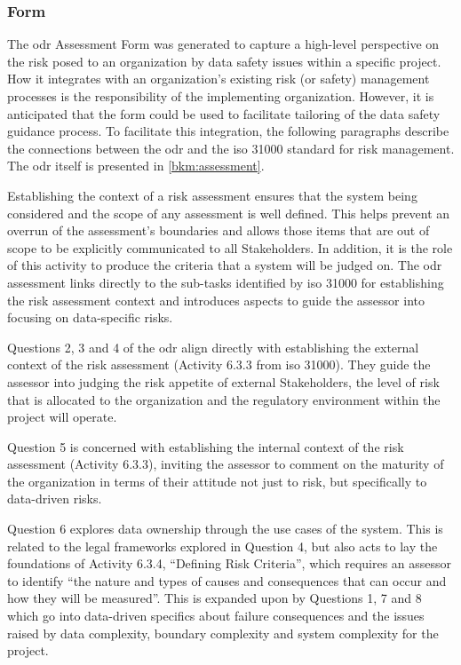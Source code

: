 \subsubsection{ Form}
The \gls{odr} Assessment Form was generated to capture a high-level perspective on the risk posed to an organization by data safety issues within a specific project. How it integrates with an organization's existing risk (or safety) management processes is the responsibility of the implementing organization.
However, it is anticipated that the form could be used to facilitate tailoring of the data safety guidance process.
To facilitate this integration, the following paragraphs describe the connections between the \gls{odr} and the
\acrshort{iso} 31000 \cite{citation:iso310002018risk}
standard for risk management.
The \gls{odr} itself is presented in \autoref{bkm:assessment}.

Establishing the context of a risk assessment ensures that the system being considered and the scope of any assessment is well defined. This helps prevent an overrun of the assessment's boundaries and allows those items that are out of scope to be explicitly communicated to all Stakeholders. In addition, it is the role of this activity to produce the criteria that a system will be judged on. The \gls{odr} assessment links directly to the sub-tasks identified by \acrshort{iso} 31000 for establishing the risk assessment context and introduces aspects to guide the assessor into focusing on data-specific risks.

Questions 2, 3 and 4 of the \gls{odr} align directly with establishing the external context of the risk assessment
(Activity 6.3.3 from \acrshort{iso} 31000).
They guide the assessor into judging the risk appetite of external Stakeholders, the level of risk that is allocated to the organization and the regulatory environment within the project will operate.

Question 5 is concerned with establishing the internal context of the risk assessment
(Activity 6.3.3),
inviting the assessor to comment on the maturity of the organization in terms of their attitude not just to risk, but specifically to data-driven risks.

Question 6 explores data ownership through the use cases of the system. This is related to the legal frameworks explored in Question 4, but also acts to lay the foundations of Activity
6.3.4,
``Defining Risk Criteria'', which requires an assessor to identify ``the nature and types of causes and consequences that can occur and how they will be measured''. This is expanded upon by Questions 1, 7 and 8 which go into data-driven specifics about failure consequences and the issues raised by data complexity, boundary complexity and system complexity for the project.

